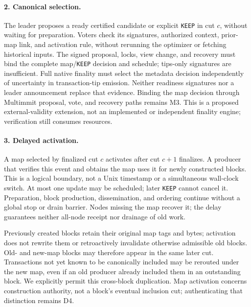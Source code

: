 \paragraph{2. Canonical selection.}
The leader proposes a ready certified candidate or explicit \texttt{KEEP} in cut \(c\), without waiting for preparation. Voters check its signatures, authorized context, prior-map link, and activation rule, without rerunning the optimizer or fetching historical inputs. The signed proposal, locks, view change, and recovery must bind the complete map/\texttt{KEEP} decision and schedule; tips-only signatures are insufficient. Full native finality must select the metadata decision independently of uncertainty in transaction-tip emission. Neither readiness signatures nor a leader announcement replace that evidence. Binding the map decision through Multimmit proposal, vote, and recovery paths remains M3. This is a proposed external-validity extension, not an implemented or independent finality engine; verification still consumes resources.



\paragraph{3. Delayed activation.}
A map selected by finalized cut \(c\) activates after cut \(c+1\) finalizes. A producer that verifies this event and obtains the map uses it for newly constructed blocks. This is a logical boundary, not a Unix timestamp or a simultaneous wall-clock switch. At most one update may be scheduled; later \texttt{KEEP} cannot cancel it. Preparation, block production, dissemination, and ordering continue without a global stop or drain barrier. Nodes missing the map recover it; the delay guarantees neither all-node receipt nor drainage of old work.

Previously created blocks retain their original map tags and bytes; activation does not rewrite them or retroactively invalidate otherwise admissible old blocks. Old- and new-map blocks may therefore appear in the same later cut. Transactions not yet known to be canonically included may be rerouted under the new map, even if an old producer already included them in an outstanding block. We explicitly permit this cross-block duplication. Map activation concerns construction authority, not a block's eventual inclusion cut; authenticating that distinction remains D4.


